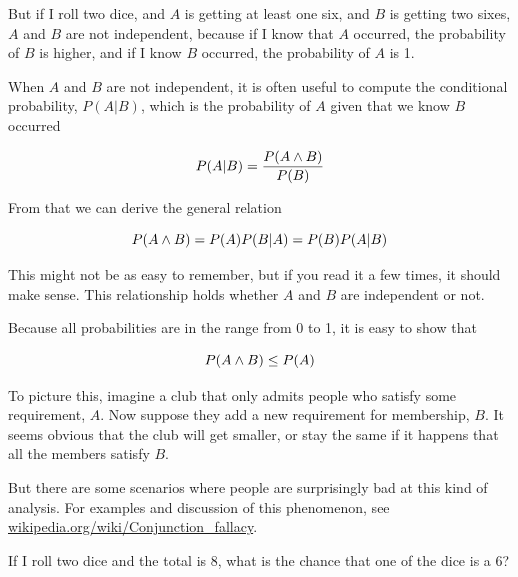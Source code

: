 \documentclass[12pt]{book}
\begin{document}
But if I roll two dice, and $A$ is getting at least one six, and
$B$ is getting two sixes, $A$ and $B$ are not independent, because
if I know that $A$ occurred, the probability of $B$ is higher, and
if I know $B$ occurred, the probability of $A$ is 1.

When $A$ and $B$ are not independent, it is often useful to compute
the conditional probability, $P(A|B)$, which is the probability of
$A$ given that we know $B$ occurred

\[ P(A|B) = \frac{P(A \wedge B)}{P(B)} \]

From that we can derive the general relation

\[ P(A \wedge B) = P(A) P(B|A) = P(B) P(A|B) \]

This might not be as easy to remember, but if you read it a few times,
it should make sense.  This relationship holds whether $A$ and $B$
are independent or not.

Because all probabilities are in the range from 0 to 1, it is
easy to show that 

\[ P(A \wedge B) \le P(A) \]

To picture this, imagine a club that only admits people
who satisfy some requirement, $A$.  Now suppose they add a new
requirement for membership, $B$.  It seems obvious that the club
will get smaller, or stay the same if it happens that all the
members satisfy $B$.

But there are some scenarios where people are surprisingly bad at this
kind of analysis.  For examples and discussion of this phenomenon, see
\url{wikipedia.org/wiki/Conjunction_fallacy}.


\begin{ex}

If I roll two dice and the total is 8, what is the chance that
one of the dice is a 6?

\end{ex}
\end{document}
